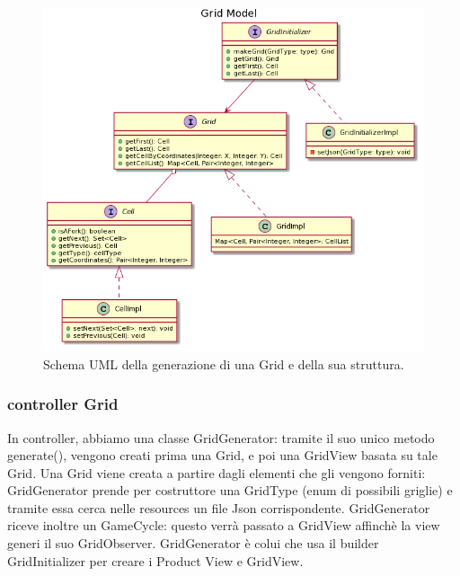 \documentclass[a4paper,12pt]{report}
\begin{document}
	\begin{figure}[h]
		\centering{}
		\includegraphics[width=\textwidth]{images/miriana/grid_model.png}
		\caption{Schema UML della generazione di una Grid e della sua struttura.}
		\label{img:gridmodel}
	\end{figure}

    \subsubsection {controller Grid}
	In controller, abbiamo una classe GridGenerator: tramite il suo unico metodo generate(), vengono creati prima una Grid, e poi una GridView basata su tale Grid.
	Una Grid viene creata a partire dagli elementi che gli vengono forniti: GridGenerator prende per costruttore una GridType (enum di possibili griglie) e tramite essa cerca nelle resources un file Json corrispondente.
	GridGenerator riceve inoltre un GameCycle: questo verrà passato a GridView affinchè la view generi il suo GridObserver.
    GridGenerator è colui che usa il builder GridInitializer per creare i Product View e GridView.
\end{document}
